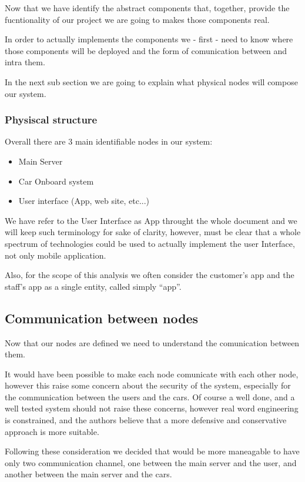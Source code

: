 \documentclass[11pt]{article} %
\begin{document}
\begin{description}
Now that we have identify the abstract components that, together, provide the fucntionality of our project we are going to makes those components real.

In order to actually implements the components we - first - need to know where those components will be deployed and the form of comunication between and intra them.

In the next sub section we are going to explain what physical nodes will compose our system.

\subsubsection{Physiscal structure}

Overall there are 3 main identifiable nodes in our system:
\begin{itemize}
	\item Main Server
	\item Car Onboard system
	\item User interface (App, web site, etc...)
\end{itemize}

We have refer to the User Interface as App throught the whole document and we will keep such terminology for sake of clarity, however, must be clear that a whole spectrum of technologies could be used to actually implement the user Interface, not only mobile application.

Also, for the scope of this analysis we often consider the customer's app and the staff's app as a single entity, called simply ``app''.


\subsection{Communication between nodes}

Now that our nodes are defined we need to understand the comunication between them.

It would have been possible to make each node comunicate with each other node, however this raise some concern about the security of the system, especially for the communication between the users and the cars. Of course a well done, and a well tested system should not raise these concerns, however real word engineering is constrained, and the authors believe that a more defensive and conservative approach is more suitable.

Following these consideration we decided that would be more maneagable to have only two communication channel, one between the main server and the user, and another between the main server and the cars. 


\end{description}
\end{document}
